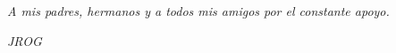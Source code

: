 \textit{}
\vspace{90mm}

\begin{flushright}



\textit{A mis padres, hermanos y a todos mis amigos por el constante apoyo.}

\textit{JROG}
\end{flushright}


\vspace{20mm}









\newpage
